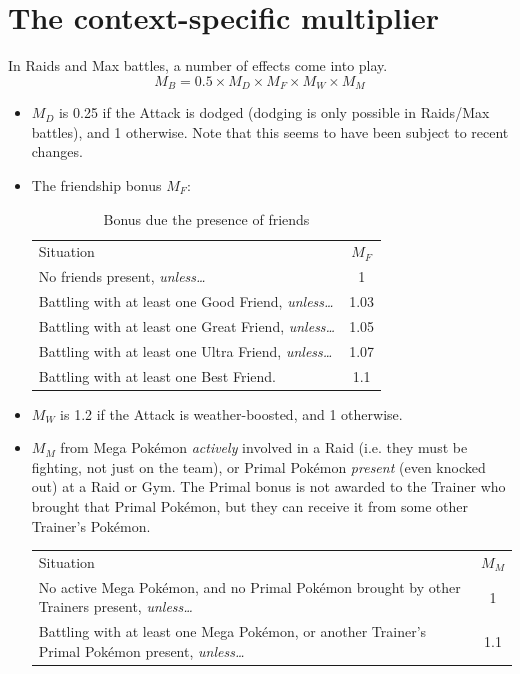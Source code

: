 \section{The context-specific multiplier\label{sec:mbmult}}
In Raids and Max battles, a number of effects come into play.
\[ M_B = 0.5 \times M_D \times M_F \times M_W \times M_M \]
\begin{itemize}
 \item $M_D$ is 0.25 if the Attack is dodged (dodging is only possible in Raids/Max battles),
 and 1 otherwise. Note that this seems to have been subject to recent changes.
 \item The friendship bonus $M_F$:
   \begin{table}[h!]
\centering
       \begin{tabular}{lc}
         Situation & $M_F$ \\
         \Midrule
         No friends present, \textit{unless…} & 1 \\
         Battling with at least one Good Friend, \textit{unless…} & 1.03 \\
         Battling with at least one Great Friend, \textit{unless…}  & 1.05 \\
         Battling with at least one Ultra Friend, \textit{unless…} & 1.07 \\
         Battling with at least one Best Friend. & 1.1
       \end{tabular}
     \caption{Bonus due the presence of friends}
   \end{table}
 \item $M_W$ is 1.2 if the Attack is weather-boosted, and 1 otherwise.
 \item $M_M$ from Mega Pokémon \textit{actively} involved in a Raid (i.e. they
   must be fighting, not just on the team), or Primal Pokémon \textit{present}
   (even knocked out) at a Raid or Gym. The Primal bonus is not awarded to the Trainer who brought
   that Primal Pokémon, but they can receive it from some other Trainer's Pokémon.
   \begin{table}[h!]
     \centering
       \begin{tabular}{p{}c}
         Situation & $M_M$ \\
         \Midrule
         No active Mega Pokémon, and no Primal Pokémon brought
          by other Trainers present, \textit{unless…} & 1 \\
         Battling with at least one Mega Pokémon,
          or another Trainer's Primal Pokémon present, \textit{unless…} & 1.1 \\

\end{tabular}
\end{table}
\end{itemize}
